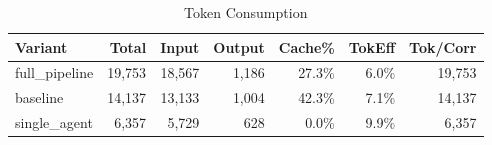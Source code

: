 \begin{table}[htbp]
\centering
\caption{Token Consumption}
\label{tab:tokens}
\begin{tabular}{l rrrr rr}
\toprule
Variant & Total & Input & Output & Cache\% & TokEff & Tok/Corr \\
\midrule
  full\_pipeline & 19,753 & 18,567 & 1,186 & 27.3\% & 6.0\% & 19,753 \\
  baseline & 14,137 & 13,133 & 1,004 & 42.3\% & 7.1\% & 14,137 \\
  single\_agent & 6,357 & 5,729 & 628 & 0.0\% & 9.9\% & 6,357 \\
\bottomrule
\end{tabular}
\end{table}

